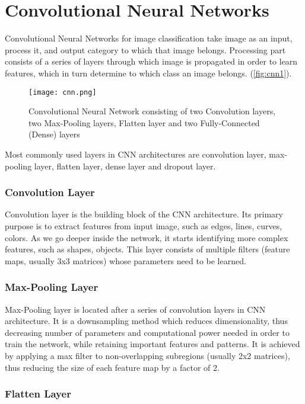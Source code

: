 \chapter{Convolutional Neural Networks} %
\label{appx:simulation}

Convolutional Neural Networks for image classification \cite{krizhevsky2012imagenet} take image as an input, process it, and output category to which that image belongs. Processing part consists of a series of layers through which image is propagated in order to learn features, which in turn determine to which class an image belongs. (\textcolor{red}{\autoref{fig:cnn1}}).

\begin{figure}[h]
	\centering
	\texttt{[image: cnn.png]}
	\caption{Convolutional Neural Network consisting of two Convolution layers, two Max-Pooling layers, Flatten layer and two Fully-Connected (Dense) layers}
	\label{fig:cnn1}
\end{figure}

Most commonly used layers in CNN architectures are convolution layer, max-pooling layer, flatten layer, dense layer and dropout layer.

\subsection{Convolution Layer}

Convolution layer is the building block of the CNN architecture. Its primary purpose is to extract features from input image, such as edges, lines, curves, colors. As we go deeper inside the network, it starts identifying more complex features, such as shapes, objects. This layer consists of multiple filters (feature maps, usually 3x3 matrices) whose parameters need to be learned.
\subsection{Max-Pooling Layer}

Max-Pooling layer is located after a series of convolution layers in CNN architecture. It is a downsampling method which reduces dimensionality, thus decreasing number of parameters and computational power needed in order to train the network, while retaining important features and patterns. It is achieved by applying a max filter to non-overlapping subregions (usually 2x2 matrices), thus reducing the size of each feature map by a factor of 2.

\subsection{Flatten Layer}

